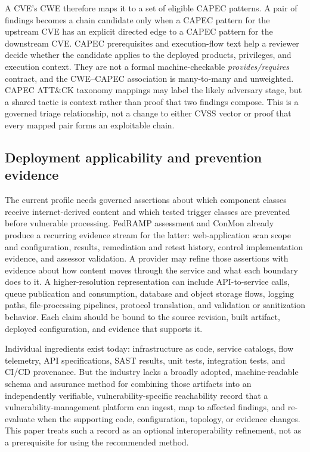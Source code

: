 \documentclass[11pt]{article}
\begin{document}
A CVE's CWE therefore maps it to a set of eligible CAPEC patterns. A pair of
findings becomes a chain candidate only when a CAPEC pattern for the upstream
CVE has an explicit directed edge to a CAPEC pattern for the downstream CVE.
CAPEC prerequisites and execution-flow text help a reviewer decide whether the
candidate applies to the deployed products, privileges, and execution context.
They are not a formal machine-checkable \emph{provides/requires} contract, and
the CWE--CAPEC association is many-to-many and unweighted. CAPEC ATT\&CK
taxonomy mappings may label the likely adversary stage, but a shared tactic is
context rather than proof that two findings compose. This is a governed triage
relationship, not a change to either CVSS vector or proof that every mapped
pair forms an exploitable chain.

\subsection{Deployment applicability and prevention evidence}
The current profile needs governed assertions about which component classes
receive internet-derived content and which tested trigger classes are prevented
before vulnerable processing. FedRAMP assessment and ConMon already produce a
recurring evidence stream for the latter: web-application scan scope and
configuration, results, remediation and retest history, control implementation
evidence, and assessor validation. A provider may refine those assertions with
evidence about how content moves through the service and what
each boundary does to it. A higher-resolution representation can include
API-to-service calls, queue publication and consumption, database and object
storage flows, logging paths, file-processing pipelines, protocol translation,
and validation or sanitization behavior. Each claim should be bound to the
source revision, built artifact, deployed configuration, and evidence that
supports it.

Individual ingredients exist today: infrastructure as code, service catalogs,
flow telemetry, API specifications, SAST results, unit tests, integration
tests, and CI/CD provenance. But the industry lacks a broadly adopted,
machine-readable schema and assurance method for combining those artifacts
into an independently verifiable, vulnerability-specific reachability record
that a vulnerability-management platform can ingest, map to affected findings,
and re-evaluate when the supporting code, configuration, topology, or evidence
changes. This paper treats such a record as an optional interoperability
refinement, not as a prerequisite for using the recommended method.
\end{document}
